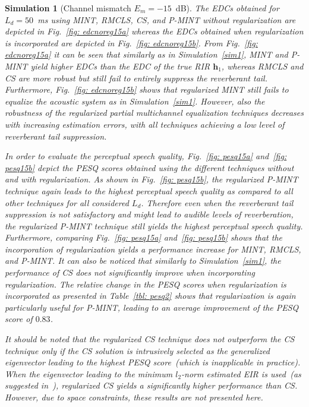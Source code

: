 \documentclass[10pt]{IEEEtran}
\newtheorem{simulation}{Simulation}
\begin{document}
\begin{simulation}[Channel mismatch $E_m=-15$~dB]
The EDCs obtained for $L_d = 50$~ms using MINT, RMCLS, CS, and P-MINT without regularization are depicted in Fig.~\ref{fig: edcnoreg15a} whereas the EDCs obtained when regularization is incorporated are depicted in Fig.~\ref{fig: edcnoreg15b}.
From Fig.~\ref{fig: edcnoreg15a} it can be seen that similarly as in Simulation~\ref{sim1}, MINT and P-MINT yield higher EDCs than the EDC of the true RIR $\mathbf{h}_1$, whereas RMCLS and CS are more robust but still fail to entirely suppress the reverberant tail.
Furthermore, Fig.~\ref{fig: edcnoreg15b} shows that regularized MINT still fails to equalize the acoustic system as in Simulation~\ref{sim1}.
However, also the robustness of the regularized partial multichannel equalization techniques decreases with increasing estimation errors, with all techniques achieving a low level of reverberant tail suppression.

In order to evaluate the perceptual speech quality, Fig.~\ref{fig: pesq15a} and~\ref{fig: pesq15b} depict the PESQ scores obtained using the different techniques without and with regularization.
As shown in Fig.~\ref{fig: pesq15b}, the regularized P-MINT technique again leads to the highest perceptual speech quality as compared to all other techniques for all considered $L_d$. Therefore even when the reverberant tail suppression is not satisfactory and might lead to audible levels of reverberation, the regularized P-MINT technique still yields the highest perceptual speech quality. 
Furthermore, comparing Fig.~\ref{fig: pesq15a} and~\ref{fig: pesq15b} shows that the incorporation of regularization yields a performance increase for MINT, RMCLS, and P-MINT.
It can also be noticed that similarly to Simulation~\ref{sim1}, the performance of CS does not significantly improve when incorporating regularization.
The relative change in the PESQ scores when regularization is incorporated as presented in Table~\ref{tbl: pesq2} shows that regularization is again particularly useful for P-MINT, leading to an average improvement of the PESQ score of $0.83$.

It should be noted that the regularized CS technique does not outperform the CS technique only if the CS solution is intrusively selected as the generalized eigenvector leading to the highest PESQ score~(which is inapplicable in practice). When the eigenvector leading to the minimum $l_2$-norm estimated EIR is used~(as suggested in~\cite{Zhang_IWAENC_2010}), regularized CS yields a significantly higher performance than CS. However, due to space constraints, these results are not presented here.
\end{simulation}
\end{document}
